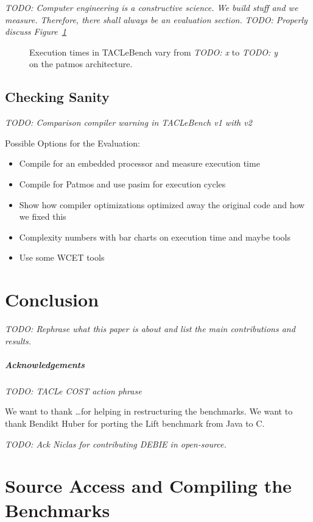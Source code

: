 \documentclass[a4paper,UKenglish]{oasics}
\newcommand{\todo}[1]{{\emph{TODO: #1}}}
\begin{document}
\todo{Computer engineering is a constructive science. We build stuff and we measure.
Therefore, there shall always be an evaluation section.}
\todo{Properly discuss Figure~\ref{fig:execution-times}}
\begin{figure}[t]
  \def\resultfile{eval/wcet.csv}
  
  \caption{Execution times in TACLeBench vary from \todo{x} to \todo{y} on the patmos architecture.}
  \label{fig:execution-times}
\end{figure}

\subsection{Checking Sanity}
\todo{Comparison compiler warning in TACLeBench v1 with v2}

Possible Options for the Evaluation:

\begin{itemize}
\item Compile for an embedded processor and measure execution time
\item Compile for Patmos and use pasim for execution cycles
\item Show how compiler optimizations optimized away the original code and how we fixed this
\item Complexity numbers with bar charts on execution time and maybe tools
\item Use some WCET tools
\end{itemize}


\section{Conclusion}
\label{sec:conclusion}

\todo{Rephrase what this paper is about and list the main contributions and results.}

\subparagraph*{Acknowledgements}

\todo{TACLe COST action phrase}

We want to thank \dots for helping in restructuring the benchmarks.
We want to thank Bendikt Huber for porting the Lift benchmark from Java to C.

\todo{Ack Niclas for contributing DEBIE in open-source.}

\appendix
\section{Source Access and Compiling the Benchmarks}



\end{document}
